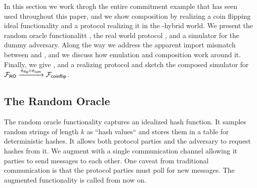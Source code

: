 In this section we work throgh the entire commitment example that has seen used throughout this paper, and we show composition by realizing a coin flipping ideal functionality \Fflip and a protocol realizing it in the \Fcom-hybrid world.
We present the random oracle functionalitt \Fro, the real world protocol , and a simulator for the dummy adversary.
Along the way we address the apparent import mismatch between \Fcom and \Fro, and we discuss how emulation and composition work around it.
Finally, we give \Fflip, and a realizing protocol and sketch the composed simulator for $\mathcal{F}_{{\mathsf {RO}}} \xrightarrow{\pi_{{\mathsf {flip}}} \circ \pi_{{\mathsf {com}}}} \mathcal{F}_{{\mathsf {coinflip}}}$.

%

\subsection{The Random Oracle}
The random oracle functionality captures an idealized hash function. It samples random strings of length $k$ as ``hash values`` and stores them in a table for deterministic hashes.
It allows both protocol parties and the adversary to request hashes from it.
We augment \Fro with a single communication channel allowing it parties to send messages to each other. One caveat from traditional communication
is that the protocol parties must poll \Fro for new messages. The augmented functionality is called \Fropp from now on.

